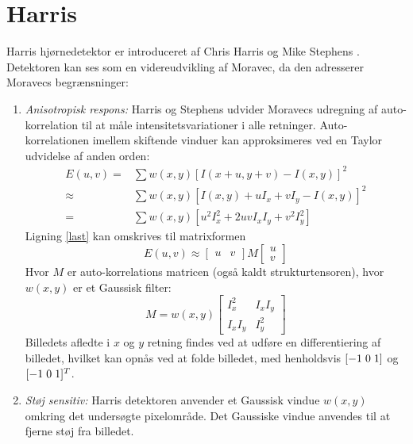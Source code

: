 \section{Harris}\label{sec:harris}
Harris hjørnedetektor er introduceret af Chris Harris og Mike Stephens \cite{harris}. Detektoren kan ses som en videreudvikling af Moravec, da den adresserer Moravecs begrænsninger:
\begin{enumerate}
\item{ \textit{Anisotropisk respons:} Harris og Stephens udvider Moravecs udregning af auto-korrelation til at måle intensitetsvariationer i alle retninger. Auto-korrelationen imellem skiftende vinduer kan approksimeres ved en Taylor udvidelse af anden orden:
\begin{subequations}
\begin{align}
E(u,v) = & \sum w(x,y)[I(x + u, y + v) - I(x,y)]^2 \\
\approx & \sum w(x,y)[I(x,y) + uI_x  + vI_y - I(x,y)]^2 \\
= & \sum w(x,y)[u^2I_x^2 + 2uvI_xI_y + v^2I_y^2]  \label{last}
\end{align}
\end{subequations}
Ligning \eqref{last} kan omskrives til matrixformen
\begin{equation}
E(u,v) \approx
\begin{bmatrix}
        u & v
     \end{bmatrix}
M
\begin{bmatrix}
        u \\
        v
     \end{bmatrix}
\end{equation} 
Hvor $M$ er auto-korrelations matricen (også kaldt strukturtensoren), hvor $w(x,y)$  er et Gaussisk filter:
\begin{equation}
M = w(x,y) 
\begin{bmatrix}
	I_x^2 & I_xI_y \\
	I_xI_y & I_y^2
\end{bmatrix}
\label{structens}
\end{equation}
Billedets afledte i $x$ og $y$ retning findes ved at udføre en differentiering af billedet, hvilket kan opnås
 ved at folde billedet, med henholdsvis $[-1 \hspace{0.1cm} 0 \hspace{0.1cm} 1]$ og $[-1 \hspace{0.1cm} 0 \hspace{0.1cm} 1]^T$. }
\item{\textit{Støj sensitiv:} Harris detektoren anvender et Gaussisk vindue $w(x,y)$ omkring det undersøgte pixelområde. Det Gaussiske vindue anvendes til at fjerne støj fra billedet.}

\end{enumerate}
